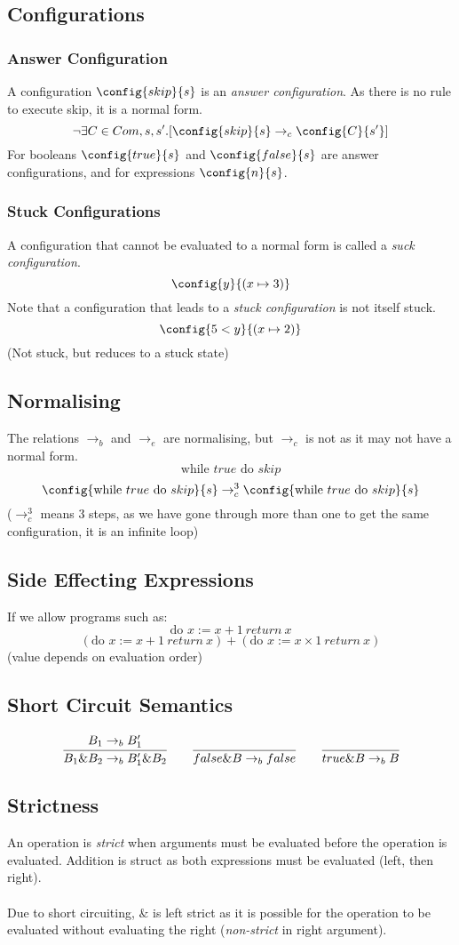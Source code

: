 \subsection{Configurations}
\subsubsection{Answer Configuration}
A configuration $\config{skip}{s}$ is an \textit{answer configuration}. As there is no rule to execute skip, it is a normal form.
\[\neg\exists C \in Com, s, s' . [\config{skip}{s} \to_c \config{C}{s'}]\]
For booleans $\config{true}{s}$ and $\config{false}{s}$ are answer configurations, and for expressions $\config{n}{s}$.
\subsubsection{Stuck Configurations}
A configuration that cannot be evaluated to a normal form is called a \textit{suck configuration}.
\[\config{y}{(x \mapsto 3)}\]
Note that a configuration that leads to a \textit{stuck configuration} is not itself stuck.
\[\config{5 < y}{(x \mapsto 2)}\]
(Not stuck, but reduces to a stuck state)
\subsection{Normalising}
The relations $\to_b$ and $\to_e$ are normalising, but $\to_c$ is not as it may not have a normal form.
\[\text{while } true \text{ do } skip\]
\[\config{\text{while } true \text{ do } skip}{s} \to_c^3 \config{\text{while } true \text{ do } skip}{s}\]
($\to_c^3$ means 3 steps, as we have gone through more than one to get the same configuration, it is an infinite loop)
\subsection{Side Effecting Expressions}
If we allow programs such as:
\[\text{do } x := x + 1 \ return \ x\]
\[(\text{do } x := x + 1 \ return \ x) + (\text{do } x := x \times 1 \ return \ x)\]
(value depends on evaluation order)
\subsection{Short Circuit Semantics}
\[\cfrac{B_1 \to_b B'_1}{B_1 \& B_2 \to_b B_1' \& B_2} \qquad \cfrac{}{false \& B \to_b false} \qquad \cfrac{}{true \& B \to_b B}\]
\subsection{Strictness}
An operation is \textit{strict} when arguments must be evaluated before the operation is evaluated. Addition is struct as both expressions must be evaluated (left, then right).
\\
\\ Due to short circuiting, $\&$ is left strict as it is possible for the operation to be evaluated without evaluating the right (\textit{non-strict} in right argument).

